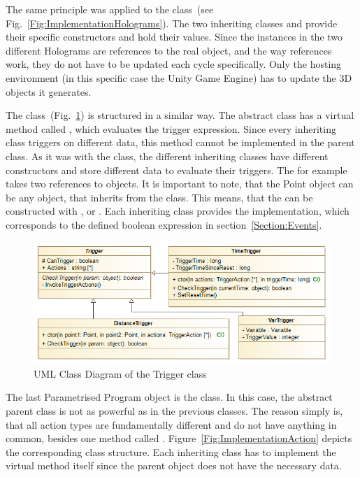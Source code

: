 The same principle was applied to the  class~(see Fig.~\ref{Fig:ImplementationHolograms}). The two inheriting classes  and  provide their specific constructors and hold their values. Since the  instances in the two different Holograms are references to the real  object, and the way references work, they do not have to be updated each cycle specifically. Only the hosting environment (in this specific case the Unity Game Engine) has to update the 3D objects it generates. 

The  class~(Fig.~\ref{Fig:ImplementationTriggers}) is structured in a similar way.  The abstract class  has a virtual method called , which evaluates the trigger expression. Since every inheriting class triggers on different data, this method cannot be implemented in the parent class. As it was with the  class, the different inheriting classes have different constructors and store different data to evaluate their triggers. The  for example takes two references to  objects. It is important to note, that the Point object can be any object, that inherits from the  class. This means, that the  can be constructed with ,  or . Each inheriting class provides the  implementation, which corresponds to the defined boolean expression in section~\ref{Section:Events}.

\begin{figure}[!h]
	\centering
	\includegraphics[width=0.7\linewidth]{Figures/Implementation_Triggers}
	\caption{UML Class Diagram of the Trigger class}
	\label{Fig:ImplementationTriggers}
\end{figure}

The last Parametrised Program object is the  class. In this case, the abstract parent class is not as powerful as in the previous classes. The reason simply is, that all action types are fundamentally different and do not have anything in common, besides one method called . Figure~\ref{Fig:ImplementationAction} depicts the corresponding class structure. Each inheriting class has to implement the virtual  method itself since the parent object does not have the necessary data.

